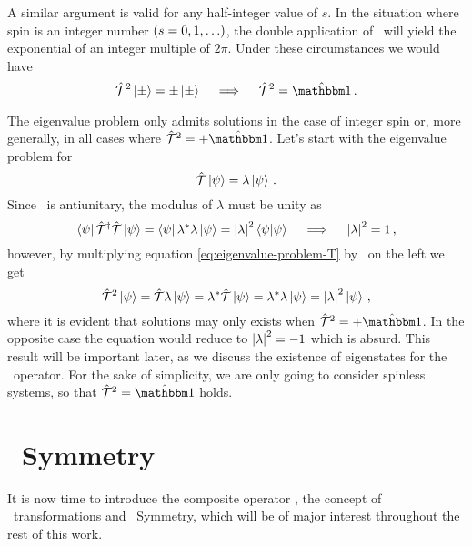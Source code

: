             A similar argument is valid for any half-integer value of $s$. In the situation where spin is an integer number $\pqty{s = 0,1,\ldots}$, the double application of \hK\ will yield the exponential of an integer multiple of $2\pi$. Under these circumstances we would have
            \begin{equation*}
                \hT^2 \ket{\pm} = \pm\ket{\pm}
                \quad\implies\quad
                \hT^2 = \togglehat{\idM}
                \myperiod
            \end{equation*}

            The eigenvalue problem only admits solutions in the case of integer spin or, more generally, in all cases where $\hT^2 = +\togglehat{\idM}$. Let's start with the eigenvalue problem for \hT
            \begin{equation}
                \label{eq:eigenvalue-problem-T}
                \mathcal{\hat{T}} \ket{\psi} = \lambda \ket{\psi}
                \,\text{.}
            \end{equation}
            Since \hT\ is antiunitary, the modulus of $\lambda$ must be unity as
            \begin{equation*}
                \bra{\psi} \mathcal{\hat{T}}^\dag \mathcal{\hat{T}} \ket{\psi}
                = \bra{\psi} \lambda^* \lambda \ket{\psi}
                = \abs{\lambda}^2 \braket{\psi}{\psi}
                \quad\implies\quad
                \abs{\lambda}^2 = 1
                \,\text{,}
            \end{equation*}
            however, by multiplying equation \eqref{eq:eigenvalue-problem-T} by \hT\ on the left we get
            \begin{equation*}
                \mathcal{\hat{T}}^2 \ket{\psi}
                = \mathcal{\hat{T}} \lambda \ket{\psi}
                = \lambda^* \mathcal{\hat{T}} \ket{\psi}
                = \lambda^* \lambda \ket{\psi}
                = \abs{\lambda}^2 \ket{\psi}
                \,\text{,}
            \end{equation*}
            where it is evident that solutions may only exists when $\hT^2 = +\togglehat{\idM}$. In the opposite case the equation would reduce to $\abs{\lambda}^2 = -1$ which is absurd. This result will be important later, as we discuss the existence of eigenstates for the \hPT\ operator. For the sake of simplicity, we are only going to consider spinless systems, so that $\hT^2 = \togglehat{\idM}$ holds.

    \section{\PT\ Symmetry}\label{s:pt-symmetry}
        It is now time to introduce the composite operator \hPT, the concept of \PT\ transformations and \PT\ Symmetry, which will be of major interest throughout the rest of this work.

